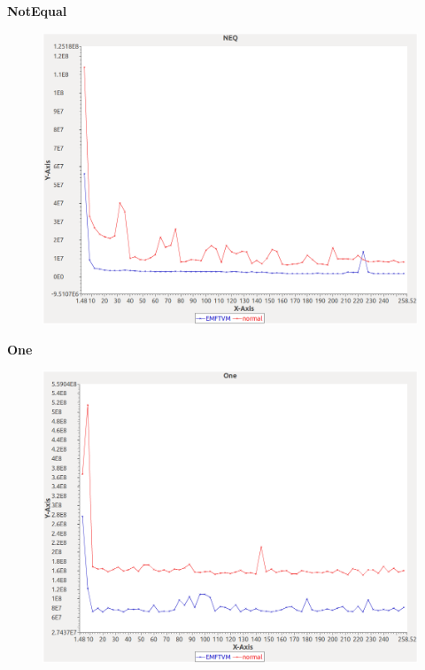 \noindent\textbf{NotEqual}

\begin{figure}[h]
\centering
\includegraphics[width=\textwidth]{graphs/orderedset/NEQ}
\end{figure}
\pagebreak

\noindent\textbf{One}

\begin{figure}[h]
\centering
\includegraphics[width=\textwidth]{graphs/orderedset/One}
\end{figure}
\pagebreak

